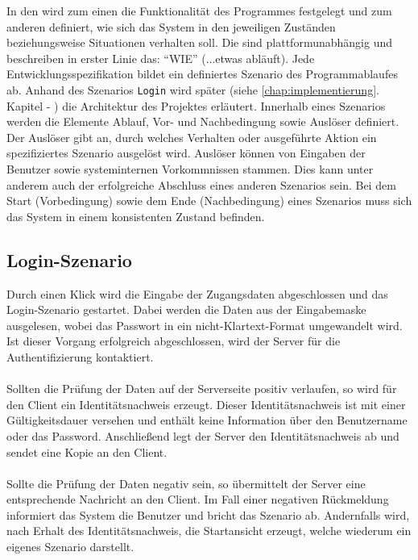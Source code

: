 \documentclass[Bachelorarbeit.tex]{subfiles}
\begin{document}
In den  wird zum einen die Funktionalität des Programmes festgelegt und zum anderen definiert, wie sich das System in den jeweiligen Zuständen beziehungsweise Situationen verhalten soll. 
Die  sind plattformunabhängig und beschreiben in erster Linie das: "`WIE"' (...etwas abläuft).
Jede Entwicklungsspezifikation bildet ein definiertes Szenario des Programmablaufes ab.
Anhand des Szenarios \texttt{Login} wird später (siehe \ref{chap:implementierung}. Kapitel - ) die Architektur des Projektes erläutert.
Innerhalb eines Szenarios werden die Elemente Ablauf, Vor- und Nachbedingung sowie Auslöser definiert. 
Der Auslöser gibt an, durch welches Verhalten oder ausgeführte Aktion ein  spezifiziertes Szenario ausgelöst wird. 
Auslöser können von Eingaben der Benutzer sowie systeminternen Vorkommnissen stammen. 
Dies kann unter anderem auch der erfolgreiche Abschluss eines anderen Szenarios sein.
Bei dem Start (Vorbedingung) sowie dem Ende (Nachbedingung) eines Szenarios muss sich das System  in einem konsistenten Zustand befinden. 

\subsection*{Login-Szenario}
\label{subsec:usecase1}
Durch einen Klick wird die Eingabe der Zugangsdaten abgeschlossen und das Login-Szenario gestartet.
Dabei werden die Daten aus der Eingabemaske ausgelesen, wobei das Passwort in ein nicht-Klartext-Format umgewandelt wird. 
Ist dieser Vorgang erfolgreich abgeschlossen, wird der Server für die Authentifizierung kontaktiert. \\
\\
Sollten die Prüfung der Daten auf der Serverseite positiv verlaufen, so wird für den Client ein Identitätsnachweis erzeugt. 
Dieser Identitätsnachweis ist mit einer Gültigkeitsdauer versehen und enthält keine Information über den Benutzername oder das Password.  
Anschließend legt der Server den Identitätsnachweis ab und sendet eine Kopie an den Client.\\
\\
Sollte die Prüfung der Daten negativ sein, so übermittelt der Server eine entsprechende Nachricht an den Client. 
Im Fall einer negativen Rückmeldung informiert das System die Benutzer und bricht das Szenario ab.
Andernfalls wird, nach Erhalt des Identitätsnachweis, die Startansicht erzeugt, welche wiederum ein eigenes Szenario darstellt.
\end{document}
